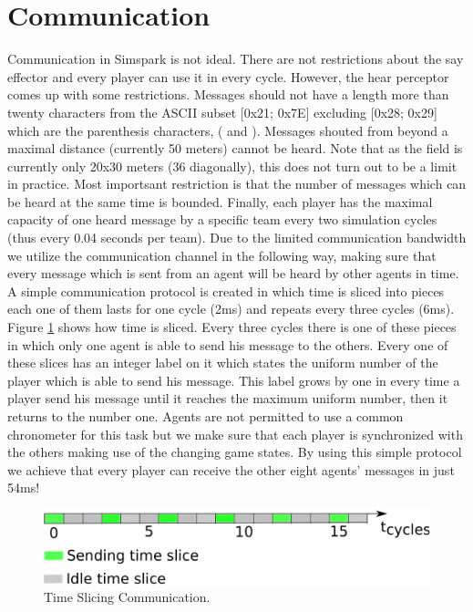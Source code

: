 \section{Communication}
Communication in Simspark is not ideal. There are not restrictions about the say effector and every player can use it in every cycle. However, the hear perceptor comes up with some restrictions. Messages should not have a length more than twenty characters from the ASCII subset [0x21; 0x7E] excluding [0x28; 0x29] which are the parenthesis characters, ( and ). Messages shouted from beyond a maximal distance (currently 50 meters) cannot be heard. Note that as the field is currently only 20x30 meters (36 diagonally), this does not turn out to be a limit in practice. Most importsant restriction is that the number of messages which can be heard at the same time is bounded. Finally, each player has the maximal capacity of one heard message by a specific team every two simulation cycles (thus every 0.04 seconds per team). Due to the limited communication bandwidth we utilize the communication channel in the following way, making sure that every message which is sent from an agent will be heard by other agents in time. A simple communication protocol is created in which time is sliced into pieces each one of them lasts for one cycle (2ms) and repeats every three cycles (6ms). Figure \ref{fig:TimeSlicing} shows how time is sliced. Every three cycles there is one of these pieces in which only one agent is able to send his message to the others. Every one of these slices has an integer label on it which states the uniform number of the player which is able to send his message. This label grows by one in every time a player send his message until it reaches the maximum uniform number, then it returns to the number one. Agents are not permitted to use a common chronometer for this task but we make sure that each player is synchronized with the others making use of the changing game states. By using this simple protocol we achieve that every player can receive the other eight agents' messages in just 54ms!
\begin{figure}[!h]
\centering
  \includegraphics[scale=0.7]{Chapter3/figures/MAC.pdf}  
  \caption{Time Slicing Communication.}
  \label{fig:TimeSlicing}
\end{figure} 